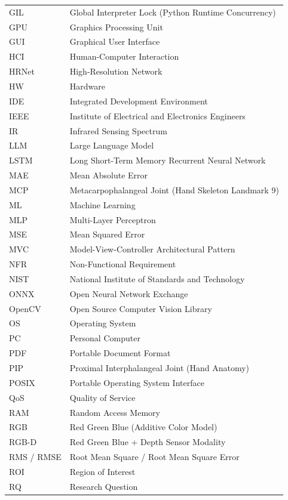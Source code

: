 {\begin{longtable}{l p{13.5cm}}
GIL & Global Interpreter Lock (Python Runtime Concurrency) \\
GPU & Graphics Processing Unit \\
GUI & Graphical User Interface \\
HCI & Human-Computer Interaction \\
HRNet & High-Resolution Network \\
HW & Hardware \\
IDE & Integrated Development Environment \\
IEEE & Institute of Electrical and Electronics Engineers \\
IR & Infrared Sensing Spectrum \\
LLM & Large Language Model \\
LSTM & Long Short-Term Memory Recurrent Neural Network \\
MAE & Mean Absolute Error \\
MCP & Metacarpophalangeal Joint (Hand Skeleton Landmark 9) \\
ML & Machine Learning \\
MLP & Multi-Layer Perceptron \\
MSE & Mean Squared Error \\
MVC & Model-View-Controller Architectural Pattern \\
NFR & Non-Functional Requirement \\
NIST & National Institute of Standards and Technology \\
ONNX & Open Neural Network Exchange \\
OpenCV & Open Source Computer Vision Library \\
OS & Operating System \\
PC & Personal Computer \\
PDF & Portable Document Format \\
PIP & Proximal Interphalangeal Joint (Hand Anatomy) \\
POSIX & Portable Operating System Interface \\
QoS & Quality of Service \\
RAM & Random Access Memory \\
RGB & Red Green Blue (Additive Color Model) \\
RGB-D & Red Green Blue + Depth Sensor Modality \\
RMS / RMSE & Root Mean Square / Root Mean Square Error \\
ROI & Region of Interest \\
RQ & Research Question \\

\end{longtable}}
